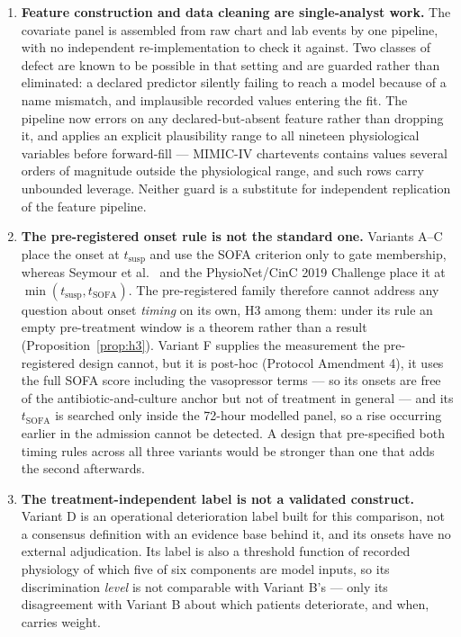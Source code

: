 \begin{enumerate}
    \item \textbf{Feature construction and data cleaning are single-analyst
    work.} The covariate panel is assembled from raw chart and lab events by
    one pipeline, with no independent re-implementation to check it against.
    Two classes of defect are known to be possible in that setting and are
    guarded rather than eliminated: a declared predictor silently failing to
    reach a model because of a name mismatch, and implausible recorded values
    entering the fit. The pipeline now errors on any declared-but-absent
    feature rather than dropping it, and applies an explicit plausibility range
    to all nineteen physiological variables before forward-fill --- MIMIC-IV
    chartevents contains values several orders of magnitude outside the
    physiological range, and such rows carry unbounded leverage. Neither guard
    is a substitute for independent replication of the feature pipeline.

    \item \textbf{The pre-registered onset rule is not the standard one.}
    Variants A--C place the onset at $t_{\text{susp}}$ and use the SOFA
    criterion only to gate membership, whereas Seymour et al.\
    \cite{seymour2016assessment} and the PhysioNet/CinC 2019 Challenge
    \cite{reyna2020utility} place it at
    $\min(t_{\text{susp}}, t_{\text{SOFA}})$. The pre-registered family
    therefore cannot address any question about onset \emph{timing} on its own,
    H3 among them: under its rule an empty pre-treatment window is a theorem
    rather than a result (Proposition~\ref{prop:h3}). Variant F supplies the
    measurement the pre-registered design cannot, but it is post-hoc (Protocol
    Amendment 4), it uses the full SOFA score including the vasopressor terms
    --- so its onsets are free of the antibiotic-and-culture anchor but not of
    treatment in general --- and its $t_{\text{SOFA}}$ is searched only inside
    the 72-hour modelled panel, so a rise occurring earlier in the admission
    cannot be detected. A design that pre-specified both timing rules across all
    three variants would be stronger than one that adds the second afterwards.

    \item \textbf{The treatment-independent label is not a validated construct.}
    Variant D is an operational deterioration label built for this comparison,
    not a consensus definition with an evidence base behind it, and its onsets
    have no external adjudication. Its label is also a threshold function of
    recorded physiology of which five of six components are model inputs, so
    its discrimination \emph{level} is not comparable with Variant B's --- only
    its disagreement with Variant B about which patients deteriorate, and when,
    carries weight.


\end{enumerate}
